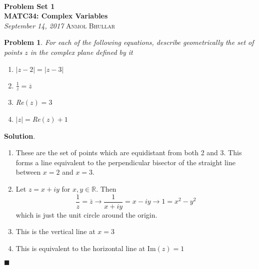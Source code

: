 \documentclass[12pt]{article}
\newcommand{\abs}[1]{\left| #1 \right|} %
\renewcommand{\=}[1]{\stackrel{#1}{=}} %
\providecommand{\RR}{\mathbb{R}}
\newtheorem{p}{Problem}[section]
\theoremstyle{definition}
\newenvironment{s}{%
        \begin{trivlist} \item \textbf{Solution}. }{%
            \hspace*{\fill} $\blacksquare$\end{trivlist}}%
\begin{document}
{\noindent\Huge\bf  \\[0.5\baselineskip] {\selectfont  %
Problem Set 1}         }\\[2\baselineskip] %
{ {\bf {}\selectfont MATC34: Complex Variables}\\ {\textit{%
\selectfont September 14, 2017}}}
{\large \textsc{Anmol Bhullar}} %
\\[1.4\baselineskip]

\begin{p}
    For each of the following equations, describe geometrically the set of points $z$ in the
    complex plane defined by it
    \begin{enumerate}
        \item $\abs{z-2} = \abs{z-3}$
        \item $\frac{1}{z} = \overline{z}$
        \item Re$(z) = 3$
        \item $\abs{z} = $Re$(z) +1$
    \end{enumerate}
\end{p}
\begin{s}
    \begin{enumerate}
        \item These are the set of points which are equidistant from both 2 and 3. This forms a line
            equivalent to the perpendicular bisector of the straight line between $x=2$ and $x=3$.
        \item Let $z = x+iy$ for $x,y\in\RR$. Then 
            \[\frac{1}{z} = \overline{z} \to \frac{1}{x+iy} = x-iy \to 1 = x^2-y^2\]
            which is just the unit circle around the origin.
        \item This is the vertical line at $x=3$
        \item This is equivalent to the horizontal line at Im$(z) = 1$
    \end{enumerate}
\end{s}
\end{document}

